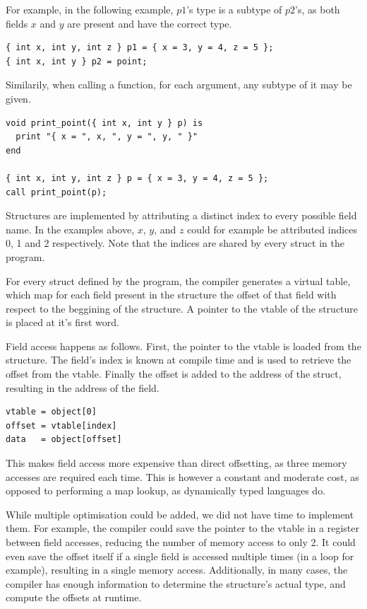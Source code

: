 \documentclass{article}
\begin{document}
For example, in the following example, $p1$'s type is a subtype of $p2$'s, as both fields $x$ and
$y$ are present and have the correct type.

\begin{lstlisting}
{ int x, int y, int z } p1 = { x = 3, y = 4, z = 5 };
{ int x, int y } p2 = point;
\end{lstlisting}

Similarily, when calling a function, for each argument, any subtype of it may be given.
\begin{lstlisting}
void print_point({ int x, int y } p) is
  print "{ x = ", x, ", y = ", y, " }"
end

{ int x, int y, int z } p = { x = 3, y = 4, z = 5 };
call print_point(p);
\end{lstlisting}

Structures are implemented by attributing a distinct index to every possible field name. In the examples
above, $x$, $y$, and $z$ could for example be attributed indices 0, 1 and 2 respectively.
Note that the indices are shared by every struct in the program.

For every struct defined by the program, the compiler generates a virtual table, which map for each field
present in the structure the offset of that field with respect to the beggining of the structure.
A pointer to the vtable of the structure is placed at it's first word.

Field access happens as follows. First, the pointer to the vtable is loaded from the structure. The field's
index is known at compile time and is used to retrieve the offset from the vtable. Finally the offset is
added to the address of the struct, resulting in the address of the field.

\begin{lstlisting}
vtable = object[0]
offset = vtable[index]
data   = object[offset]
\end{lstlisting}

This makes field access more expensive than direct offsetting, as three memory accesses are required each time.
This is however a constant and moderate cost, as opposed to performing a map lookup, as dynamically typed languages do.

While multiple optimisation could be added, we did not have time to implement them.
For example, the compiler could save the pointer to the vtable in a register between field accesses, reducing the
number of memory access to only 2. It could even save the offset itself if a single field is accessed multiple
times (in a loop for example), resulting in a single memory access. Additionally, in many cases, the compiler
has enough information to determine the structure's actual type, and compute the offsets at runtime.
\end{document}
